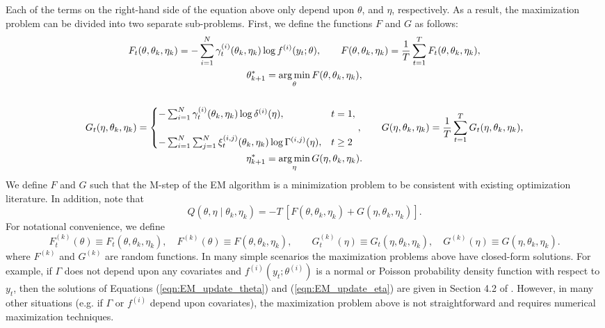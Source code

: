 Each of the terms on the right-hand side of the equation above only depend upon $\theta$, and $\eta$, respectively. As a result, the maximization problem can be divided into two separate sub-problems. First, we define the functions $F$ and $G$ as follows:
%
\begin{gather}
    F_t(\theta, \theta_k, \eta_k) = - \sum_{i=1}^N \gamma^{(i)}_t(\theta_k, \eta_k) \log f^{(i)}(y_t;\theta), \qquad
    F(\theta, \theta_k,\eta_k) = \frac{1}{T} \sum_{t=1}^T F_t(\theta, \theta_k, \eta_k), \label{eqn:F} \\
    \theta^*_{k+1} = \operatorname*{arg\,min}_{\theta} F(\theta,\theta_k,\eta_k), \label{eqn:EM_update_theta} \\ \nonumber \\
    G_t(\eta, \theta_k, \eta_k) = 
    \begin{cases}
        - \sum_{i=1}^N \gamma^{(i)}_t(\theta_k,\eta_k) \log \delta^{(i)}(\eta), & t = 1, \\\\
        - \sum_{i=1}^N \sum_{j=1}^N \xi^{(i,j)}_t(\theta_k, \eta_k) \log \Gamma^{(i,j)}(\eta), & t \geq 2
    \end{cases}, \qquad
    G(\eta, \theta_k,\eta_k) = \frac{1}{T} \sum_{t=1}^{T} G_t(\eta, \theta_k, \eta_k), \label{eqn:G}\\
    \eta^*_{k+1} = \operatorname*{arg\,min}_{\eta} G(\eta,\theta_k,\eta_k). \label{eqn:EM_update_eta}
\end{gather}
We define $F$ and $G$ such that the M-step of the EM algorithm is a minimization problem to be consistent with existing optimization literature. In addition, note that 
\begin{equation}
   Q(\theta, \eta \mid \theta_{k},\eta_{k}) = -T ~ \left[F(\theta, \theta_k, \eta_k) + G(\eta, \theta_k, \eta_k)\right].
\end{equation}
For notational convenience, we define
\begin{equation}
    F_t^{(k)}(\theta) \equiv F_t(\theta,\theta_k,\eta_k), \quad F^{(k)}(\theta) \equiv F(\theta,\theta_k,\eta_k), \qquad G_t^{(k)}(\eta) \equiv G_t(\eta,\theta_k,\eta_k), \quad G^{(k)}(\eta) \equiv G(\eta,\theta_k,\eta_k).
    \label{eqn:FtGt}
\end{equation}
%
where $F^{(k)}$ and $G^{(k)}$ are random functions. In many simple scenarios the maximization problems above have closed-form solutions. For example, if $\Gamma$ does not depend upon any covariates and $f^{(i)}(y_t;\theta^{(i)})$ is a normal or Poisson probability density function with respect to $y_t$, then the solutions of Equations (\ref{eqn:EM_update_theta}) and (\ref{eqn:EM_update_eta}) are given in Section 4.2 of \citet{Zucchini:2016}. However, in many other situations (e.g. if $\Gamma$ or $f^{(i)}$ depend upon covariates), the maximization problem above is not straightforward and requires numerical maximization techniques. %


